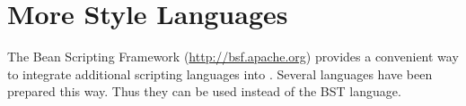 
\section{More Style Languages}

The Bean Scripting Framework (\url{http://bsf.apache.org}) provides a
convenient way to integrate additional scripting languages into
\ExBib. Several languages have been prepared this way. Thus they can
be used instead of the BST language.



\endinput%
%

